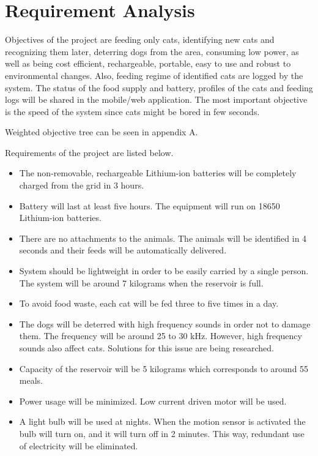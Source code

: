 \section{Requirement Analysis} \label{sec:req_anal}


Objectives of the project are feeding only cats, identifying new cats and recognizing them later, deterring dogs from the area, consuming low power, as well as being cost efficient, rechargeable, portable, easy to use and robust to environmental changes.
Also, feeding regime of identified cats are logged by the system. The status of the food supply and battery, profiles of the cats and feeding logs will be shared in the mobile/web application. The most important objective is the speed of the system since cats might be bored in few seconds.

Weighted objective tree can be seen in appendix A.

Requirements of the project are listed below.
\begin{itemize}
\item The non-removable, rechargeable Lithium-ion batteries will be completely charged from the grid in 3 hours.
\item Battery will last at least five hours. The equipment will run on 18650 Lithium-ion batteries.
\item There are no attachments to the animals. The animals will be identified in 4 seconds and their feeds will be automatically delivered. 
\item System should be lightweight in order to be easily carried by a single person. The system will be around 7 kilograms when the reservoir is full.
\item To avoid food waste, each cat will be fed three to five times in a day.
\item The dogs will be deterred with high frequency sounds in order not to damage them. The frequency will be around 25 to 30 kHz. However, high frequency sounds also affect cats. Solutions for this issue are being researched.
\item Capacity of the reservoir will be 5 kilograms which corresponds to around 55 meals.
\item Power usage will be minimized. Low current driven motor will be used.
\item A light bulb will be used at nights. When the motion sensor is activated the bulb will turn on, and it will turn off in 2 minutes. This way, redundant use of electricity will be eliminated.
\end{itemize}


